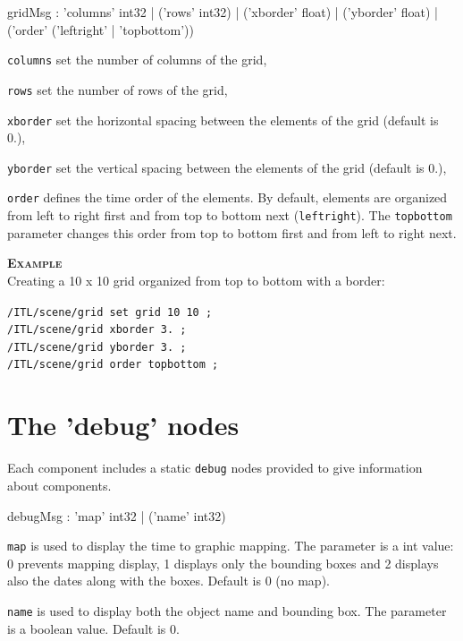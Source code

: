 \documentclass[a4paper,twoside]{report}
\newcommand{\sublevel}[1]	{\section{#1}}
\newcommand{\OSC}[1]		{\texttt{#1}}
\newcommand{\example}		{\textbf{\hspace{-1.5cm}\textbf{\textsc{Example }}}}
\let\olditemize\itemize
\let\oldenditemize\enditemize
\renewenvironment{itemize} 	{\olditemize \setlength{\itemsep}{1mm}}{\oldenditemize}
\newcommand{\sample}	[1]			{\vspace{-2mm}\begin{center}\colorbox{mygrey}{
								\begin{minipage}[t]{0.9\columnwidth} 
								{\small \texttt{#1}}
								\end{minipage}}\end{center}}
\begin{document}
\begin{rail}
gridMsg : 'columns' int32
		| ('rows' int32) 
		| ('xborder' float)
		| ('yborder' float)
		| ('order' ('leftright' | 'topbottom'))
\end{rail}

\begin{itemize}
\item \OSC{columns} set the number of columns of the grid,
\item \OSC{rows} set the number of rows of the grid,
\item \OSC{xborder} set the horizontal spacing between the elements of the grid (default is 0.),
\item \OSC{yborder} set the vertical spacing between the elements of the grid (default is 0.),
\item \OSC{order} defines the time order of the elements. By default, elements are organized from left to right first and from top to bottom next (\OSC{leftright}). The \OSC{topbottom} parameter changes this order from top to bottom first and from left to right next.
\end{itemize}

\example \\
Creating a 10 x 10 grid organized from top to bottom with a border:
\sample{/ITL/scene/grid set grid 10 10 ;\\
/ITL/scene/grid xborder 3. ;\\
/ITL/scene/grid yborder 3. ;\\
/ITL/scene/grid order topbottom ;
}


\sublevel{The 'debug' nodes}
\label{debugnode}

Each component includes a static \OSC{debug} nodes provided to give information about components.
\begin{rail}
debugMsg : 'map' int32
		| ('name' int32) 
\end{rail}

\begin{itemize}
\item \OSC{map} is used to display the time to graphic mapping. The parameter is a int value: 0 prevents mapping display, 1 displays only the bounding boxes and 2 displays also the dates along with the boxes. Default is 0 (no map).
\item \OSC{name} is used to display both the object name and bounding box. The parameter is a boolean value. Default is 0.
\end{itemize}
\end{document}
